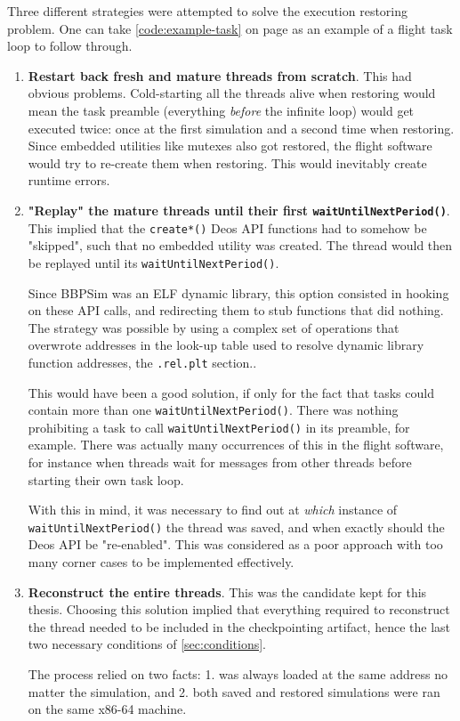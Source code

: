 Three different strategies were attempted to solve the execution restoring problem. One can take \autoref{code:example-task} on page \pageref{code:example-task} as an example of a flight task loop to follow through.
\begin{enumerate}
	\item \textbf{Restart back fresh and mature threads from scratch}. This had obvious problems.  Cold-starting all the threads alive when restoring would mean the task preamble (everything \textit{before} the infinite loop) would get executed twice: once at the first simulation and a second time when restoring. Since embedded utilities like mutexes also got restored, the flight software would try to re-create them when restoring. This would inevitably create runtime errors.
	
	\item \textbf{"Replay" the mature threads until their first \texttt{waitUntilNextPeriod()}}. This implied that the \texttt{create*()} Deos API functions had to somehow be "skipped", such that no embedded utility was created. The thread would then be replayed until its \texttt{waitUntilNextPeriod()}.
	
	Since \gls{BBPSim} was an \gls{ELF} dynamic library, this option consisted in hooking on these API calls, and redirecting them to stub functions that did nothing. The strategy was possible by using a complex set of operations that overwrote addresses in the look-up table used to resolve dynamic library function addresses, the \texttt{.rel.plt} section.\cite{online:shoumikhin}.
	
	This would have been a good solution, if only for the fact that tasks could contain more than one \texttt{waitUntilNextPeriod()}. There was nothing prohibiting a task to call \texttt{waitUntilNextPeriod()} in its preamble, for example. There was actually many occurrences of this in the flight software, for instance when threads wait for messages from other threads before starting their own task loop.
	
	With this in mind, it was necessary to find out at \textit{which} instance of \texttt{waitUntilNextPeriod()} the thread was saved, and when exactly should the Deos API be "re-enabled". This was considered as a poor approach with too many corner cases to be implemented effectively.
	
	\item \textbf{Reconstruct the entire threads}. This was the candidate kept for this thesis. Choosing this solution implied that everything required to reconstruct the thread needed to be included in the checkpointing artifact, hence the last two necessary conditions of \autoref{sec:conditions}. 
	
	The process relied on two facts: 1. was always loaded at the same address no matter the simulation, and 2. both saved and restored simulations were ran on the same x86-64 machine. 
\end{enumerate}


